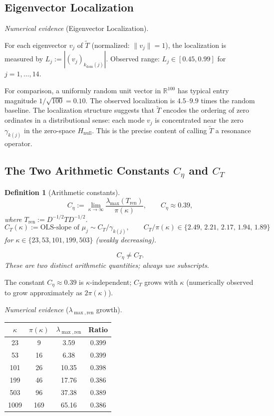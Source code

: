 \documentclass[11pt]{article}
\newtheorem{definition}[theorem]{Definition}
\newcommand{\Hnull}{H_{\mathrm{null}}}
\newcommand{\Tren}{T_{\mathrm{ren}}}
\newcommand{\Tt}{\widetilde{T}}
\newcommand{\Ceta}{C_{\eta}}
\newcommand{\CT}{C_{T}}
\newcommand{\kdom}{k_{\mathrm{dom}}}
\begin{document}
\subsection{Eigenvector Localization}

\emph{Numerical evidence} (Eigenvector Localization).

For each eigenvector $v_j$ of $\Tt$ (normalized: $\|v_j\|=1$),
the localization is measured by $L_j := |(v_j)_{\kdom(j)}|$.
Observed range: $L_j\in[0.45,0.99]$ for $j=1,\ldots,14$.

For comparison, a uniformly random unit vector in $\mathbb{R}^{100}$
has typical entry magnitude $1/\sqrt{100} = 0.10$.
The observed localization is $4.5$--$9.9$ times the random baseline.
The localization structure suggests that $\Tt$ encodes
the ordering of zero ordinates in a distributional sense:
each mode $v_j$ is concentrated near the zero $\gamma_{k(j)}$
in the zero-space $\Hnull$.
This is the precise content of calling $\Tt$ a resonance operator.

\subsection{The Two Arithmetic Constants $\Ceta$ and $\CT$}

\begin{definition}[Arithmetic constants]\label{def:constants}
\[
\Ceta := \lim_{\kappa\to\infty}\frac{\lambda_{\max}(\Tren)}{\pi(\kappa)},
\qquad\Ceta\approx 0.39,
\]
where $\Tren := D^{-1/2}TD^{-1/2}$.
\[
\CT(\kappa) := \text{OLS-slope of } \mu_j\sim\CT/\gamma_{k(j)},
\qquad \CT/\pi(\kappa) \in \{2.49,\,2.21,\,2.17,\,1.94,\,1.89\}
\]
for $\kappa\in\{23,53,101,199,503\}$ (weakly decreasing).

\[
\Ceta \neq \CT.
\]
\emph{These are two distinct arithmetic quantities; always use subscripts.}
\end{definition}

The constant $\Ceta\approx 0.39$ is $\kappa$-independent;
$\CT$ grows with $\kappa$ (numerically observed to grow approximately as $2\pi(\kappa)$).

\emph{Numerical evidence} ($\lambda_{\max,\mathrm{ren}}$ growth).

\begin{center}
\begin{tabular}{cccc}
\toprule
$\kappa$ & $\pi(\kappa)$ & $\lambda_{\max,\mathrm{ren}}$ & Ratio \\
\midrule
23  & 9   & 3.59  & 0.399 \\
53  & 16  & 6.38  & 0.399 \\
101 & 26  & 10.35 & 0.398 \\
199 & 46  & 17.76 & 0.386 \\
503 & 96  & 37.38 & 0.389 \\
1009 & 169 & 65.16 & 0.386 \\
\bottomrule
\end{tabular}
\end{center}
\end{document}

